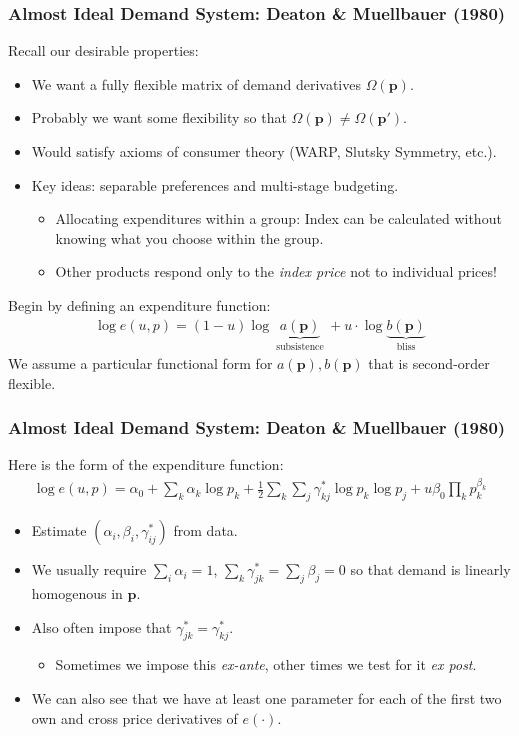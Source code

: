 \documentclass[xcolor=pdftex,dvipsnames,table,mathserif,aspectratio=169]{beamer}
\begin{document}
\begin{frame}
\frametitle{Almost Ideal Demand System: Deaton \& Muellbauer (1980)}
Recall our desirable properties:
\begin{itemize}
\item We want a fully flexible matrix of demand derivatives $\Omega(\mathbf{p})$.
\item Probably we want some flexibility so that $\Omega(\mathbf{p}) \neq \Omega(\mathbf{p'})$.
\item Would satisfy axioms of consumer theory (WARP, Slutsky Symmetry, etc.).
\item Key ideas: \alert{separable preferences} and \alert{multi-stage budgeting}.
\begin{itemize}
\item Allocating expenditures within a group: Index can be calculated without knowing what you choose within the group. 
\item Other products respond only to the \textit{index price} not to individual prices!
\end{itemize}
\end{itemize}
Begin by defining an expenditure function:
\begin{eqnarray*}
\log e(u,p) = (1- u) \log \underbrace{a(\mathbf{p})}_{\text{ subsistence }} + u \cdot \log \underbrace{b(\mathbf{p})}_{\text{ bliss }}
\end{eqnarray*}
We assume a particular functional form for $a(\mathbf{p}),b(\mathbf{p})$ that is second-order flexible.
\end{frame}

\begin{frame}
\frametitle{Almost Ideal Demand System: Deaton \& Muellbauer (1980)}
\small
Here is the form of the expenditure function:
\begin{eqnarray*}
\log e(u,p) =  \alpha_0 + \sum_k \alpha_k \log p_k + \frac{1}{2} \sum_k \sum_j \gamma_{kj}^{*} \log p_k \log p_j + u \beta_0 \prod_k p_k^{\beta_k}
\end{eqnarray*}
\begin{itemize}
\item Estimate $(\alpha_i, \beta_i, \gamma_{ij}^*)$ from data.
\item We usually require $\sum_i \alpha_i =1$, $\sum_k \gamma_{jk}^* = \sum_j  \beta_j = 0$ so that demand is linearly homogenous in $\mathbf{p}$. 
\item Also often impose that $\gamma_{jk}^* = \gamma_{kj}^*$.
\begin{itemize}
\item Sometimes we impose this \textit{ex-ante}, other times we test for it \textit{ex post}.
\end{itemize}
\item We can also see that we have at least one parameter for each of the first two own and cross price derivatives of $e(\cdot)$.
\end{itemize}
\end{frame} 
\end{document}
